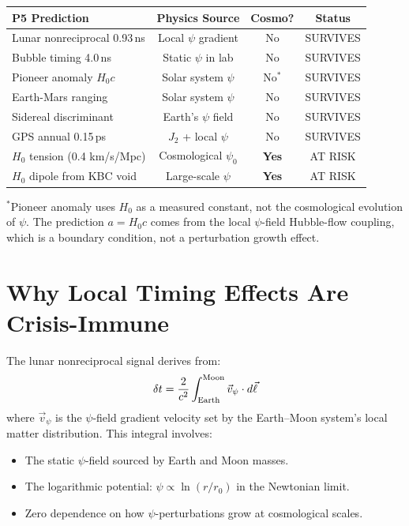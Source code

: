 \documentclass[11pt]{article}
\begin{document}
\begin{table}[h]
\centering
\begin{tabular}{lccc}
\toprule
\textbf{P5 Prediction} & \textbf{Physics Source} & \textbf{Cosmo?} & \textbf{Status} \\
\midrule
Lunar nonreciprocal 0.93\,ns & Local $\psi$ gradient & No & SURVIVES \\
Bubble timing 4.0\,ns & Static $\psi$ in lab & No & SURVIVES \\
Pioneer anomaly $H_0 c$ & Solar system $\psi$ & No$^*$ & SURVIVES \\
Earth-Mars ranging & Solar system $\psi$ & No & SURVIVES \\
Sidereal discriminant & Earth's $\psi$ field & No & SURVIVES \\
GPS annual 0.15\,ps & $J_2$ + local $\psi$ & No & SURVIVES \\
$H_0$ tension (0.4 km/s/Mpc) & Cosmological $\psi_0$ & \textbf{Yes} & AT RISK \\
$H_0$ dipole from KBC void & Large-scale $\psi$ & \textbf{Yes} & AT RISK \\
\bottomrule
\end{tabular}
\end{table}

$^*$Pioneer anomaly uses $H_0$ as a measured constant, not the cosmological
evolution of $\psi$. The prediction $a = H_0 c$ comes from the local
$\psi$-field Hubble-flow coupling, which is a boundary condition, not
a perturbation growth effect.

\section{Why Local Timing Effects Are Crisis-Immune}

The lunar nonreciprocal signal derives from:
\begin{equation}
\delta t = \frac{2}{c^2}\int_{\rm Earth}^{\rm Moon}
\vec{v}_\psi \cdot d\vec{\ell}
\end{equation}
where $\vec{v}_\psi$ is the $\psi$-field gradient velocity set by the
Earth--Moon system's local matter distribution. This integral involves:

\begin{itemize}
\item The static $\psi$-field sourced by Earth and Moon masses.
\item The logarithmic potential: $\psi \propto \ln(r/r_0)$ in the
  Newtonian limit.
\item Zero dependence on how $\psi$-perturbations grow at cosmological
  scales.
\end{itemize}
\end{document}
